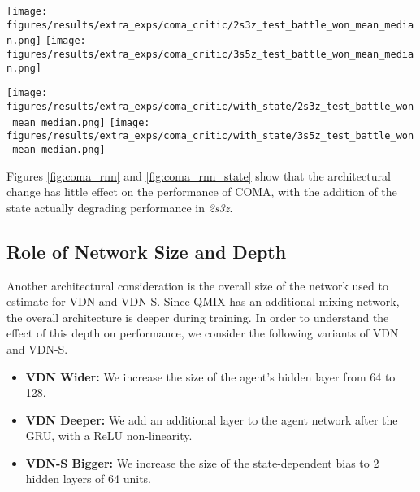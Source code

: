 \documentclass[twoside,11pt]{article}
\begin{document}
\begin{figure*}[h!]
    \centering
    \texttt{[image: figures/results/extra\_exps/coma\_critic/2s3z\_test\_battle\_won\_mean\_median.png]}
    \texttt{[image: figures/results/extra\_exps/coma\_critic/3s5z\_test\_battle\_won\_mean\_median.png]}
    \caption{Comparing the different architectures for the COMA critic without the state, on two scenarios.}
    \label{fig:coma_rnn}
\end{figure*}

\begin{figure*}[h!]
    \centering
    \texttt{[image: figures/results/extra\_exps/coma\_critic/with\_state/2s3z\_test\_battle\_won\_mean\_median.png]}
    \texttt{[image: figures/results/extra\_exps/coma\_critic/with\_state/3s5z\_test\_battle\_won\_mean\_median.png]}
    \caption{Comparing the different architectures for the COMA critic with the state on two scenarios.}
    \label{fig:coma_rnn_state}
\end{figure*}

Figures \ref{fig:coma_rnn} and \ref{fig:coma_rnn_state} show that the architectural change has little effect on the performance of COMA, with the addition of the state actually degrading performance in \textit{2s3z}. 

\subsection{Role of Network Size and Depth}

Another architectural consideration is the overall size of the network used to estimate  for VDN and VDN-S.
Since QMIX has an additional mixing network, the overall architecture is deeper 
during training.
In order to understand the effect of this depth on performance, we consider the following variants of VDN and VDN-S.
\begin{itemize}
    \item \textbf{VDN Wider:} We increase the size of the agent's hidden layer from 64 to 128. 
    \item \textbf{VDN Deeper:} We add an additional layer to the agent network after the GRU, with a ReLU non-linearity. 
    \item \textbf{VDN-S Bigger:} We increase the size of the state-dependent bias to 2 hidden layers of 64 units.
\end{itemize}
\end{document}
